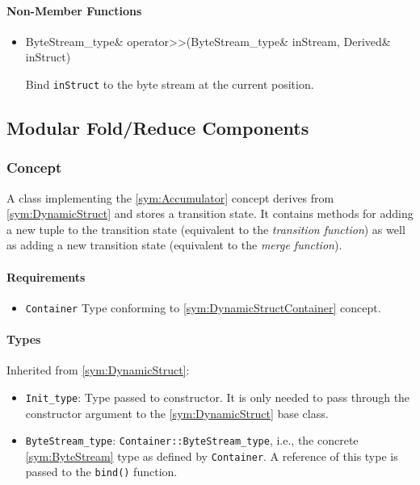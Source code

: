 \paragraph{Non-Member Functions}

\begin{itemize}
	\item
		\begin{cppsnippet}
		ByteStream_type& operator>>(ByteStream_type& inStream, Derived& inStruct)
		\end{cppsnippet}

		Bind \texttt{inStruct} to the byte stream at the current position.
\end{itemize}


\subsection{Modular Fold/Reduce Components}

\subsubsection[Concept Accumulator]{Concept }

A class implementing the \ref{sym:Accumulator} concept derives from \ref{sym:DynamicStruct} and stores a transition state. It contains methods for adding a new tuple to the transition state (equivalent to the \emph{transition function}) as well as adding a new transition state (equivalent to the \emph{merge function}).

\paragraph{Requirements}

\begin{itemize}
	\item \texttt{Container} Type conforming to \ref{sym:DynamicStructContainer} concept.
\end{itemize}

\paragraph{Types}

Inherited from \ref{sym:DynamicStruct}:
\begin{itemize}
	\item \texttt{Init\_type}: Type passed to constructor. It is only needed to pass through the constructor argument to the \ref{sym:DynamicStruct} base class.
	\item \texttt{ByteStream\_type}: \texttt{Container::ByteStream\_type}, i.e., the concrete \ref{sym:ByteStream} type as defined by \texttt{Container}. A reference of this type is passed to the \texttt{bind()} function.
\end{itemize}

